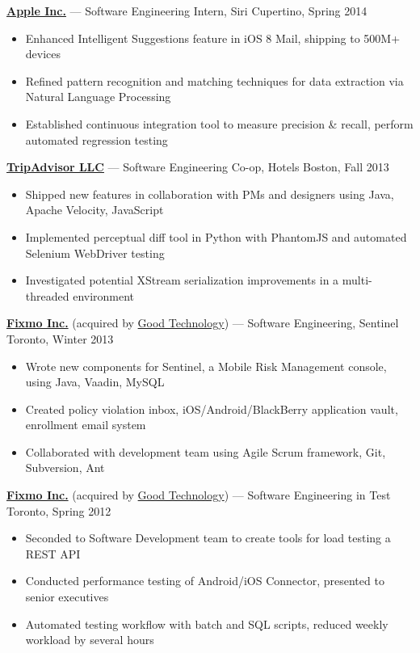 \documentclass[pdftex,11pt,letterpaper]{article}
\begin{document}
\href{https://apple.com}{\textbf{Apple Inc.}} --- Software Engineering Intern, Siri \hfill {\color{gray} Cupertino, Spring 2014}
\begin{itemize}
  \item Enhanced Intelligent Suggestions feature in iOS 8 Mail, shipping to 500M+ devices
  \item Refined pattern recognition and matching techniques for data extraction via Natural Language Processing
  \item Established continuous integration tool to measure precision \& recall, perform automated regression testing
\end{itemize}

\href{http://tripadvisor.com}{\textbf{TripAdvisor LLC}} --- Software Engineering Co-op, Hotels \hfill {\color{gray} Boston, Fall 2013}
\begin{itemize}
  \item Shipped new features in collaboration with PMs and designers using Java, Apache Velocity, JavaScript
  \item Implemented perceptual diff tool in Python with PhantomJS and automated Selenium WebDriver testing
  \item Investigated potential XStream serialization improvements in a multi-threaded environment
\end{itemize}

\href{https://www1.good.com/about/press-releases/good-technology-acquires-fixmo-security-business.html}{\textbf{Fixmo Inc.}} (acquired by \href{https://good.com}{Good Technology}) --- Software Engineering, Sentinel \hfill {\color{gray} Toronto, Winter 2013}
\begin{itemize}
  \item Wrote new components for Sentinel, a Mobile Risk Management console, using Java, Vaadin, MySQL
  \item Created policy violation inbox, iOS/Android/BlackBerry application vault, enrollment email system
  \item Collaborated with development team using Agile Scrum framework, Git, Subversion, Ant
\end{itemize}

\href{https://www1.good.com/about/press-releases/good-technology-acquires-fixmo-security-business.html}{\textbf{Fixmo Inc.}} (acquired by \href{https://good.com}{Good Technology}) --- Software Engineering in Test \hfill {\color{gray} Toronto, Spring 2012}
\begin{itemize}
  \item Seconded to Software Development team to create tools for load testing a REST API
  \item Conducted performance testing of Android/iOS Connector, presented to senior executives
  \item Automated testing workflow with batch and SQL scripts, reduced weekly workload by several hours
\end{itemize}
\end{document}
